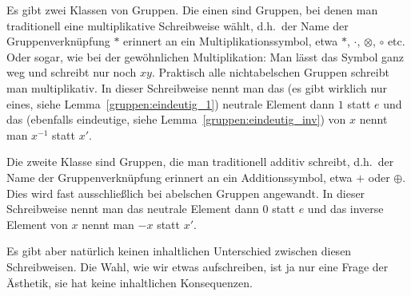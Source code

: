 \begin{remark}
    Es gibt zwei Klassen von Gruppen. Die einen sind Gruppen, bei denen man traditionell eine multiplikative Schreibweise wählt, d.h.\ der Name der Gruppenverknüpfung $\ast$ erinnert an ein Multiplikationssymbol, etwa $*$, $\cdot$, $\otimes$, $\circ$ etc. Oder sogar, wie bei der gewöhnlichen Multiplikation: Man lässt das Symbol ganz weg und schreibt nur noch $xy$. Praktisch alle nichtabelschen Gruppen schreibt man multiplikativ. In dieser Schreibweise nennt man das (es gibt wirklich nur eines, siehe Lemma~\ref{gruppen:eindeutig_1}) neutrale Element dann $1$ statt $e$ und das (ebenfalls eindeutige, siehe Lemma~\ref{gruppen:eindeutig_inv}) von $x$ nennt man $x^{-1}$ statt $x'$.

    Die zweite Klasse sind Gruppen, die man traditionell additiv schreibt, d.h.\ der Name der Gruppenverknüpfung erinnert an ein Additionssymbol, etwa $+$ oder $\oplus$. Dies wird fast ausschließlich bei abelschen Gruppen angewandt. In dieser Schreibweise nennt man das neutrale Element dann $0$ statt $e$ und das inverse Element von $x$ nennt man $-x$ statt $x'$.

    Es gibt aber natürlich keinen inhaltlichen Unterschied zwischen diesen Schreibweisen. Die Wahl, wie wir etwas aufschreiben, ist ja nur eine Frage der Ästhetik, sie hat keine inhaltlichen Konsequenzen.
\end{remark}

